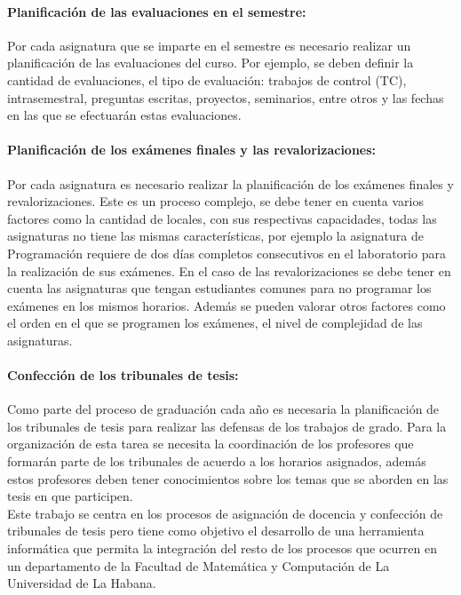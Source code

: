 \paragraph{Planificación de las evaluaciones en el semestre:}
Por cada asignatura que se imparte en el semestre es necesario realizar un planificación de 
las evaluaciones del curso. Por ejemplo, se deben definir la cantidad de evaluaciones, el tipo 
de evaluación: trabajos de control (TC), intrasemestral, preguntas escritas, proyectos, seminarios, entre 
otros y las fechas en las que se efectuarán estas evaluaciones.

\paragraph{Planificación de los exámenes finales y las revalorizaciones:}
Por cada asignatura es necesario realizar la planificación de los exámenes
finales y revalorizaciones. Este es un proceso complejo, se debe tener en cuenta 
varios factores como la cantidad de locales, con sus respectivas capacidades,
todas las asignaturas no tiene las mismas características, por ejemplo la asignatura de 
Programación requiere de dos días completos consecutivos en el laboratorio para 
la realización de sus exámenes. En el caso de las revalorizaciones
se debe tener en cuenta las asignaturas que tengan estudiantes comunes para no programar los 
exámenes en los mismos horarios. Además se pueden valorar otros factores como el orden en el que 
se programen los exámenes, el nivel de complejidad de las asignaturas.

\paragraph{Confección de los tribunales de tesis:}
Como parte del proceso de graduación cada año 
es necesaria la planificación de los tribunales de tesis para 
realizar las defensas de los trabajos de grado. Para la organización 
de esta tarea se necesita la coordinación de los profesores que formarán parte 
de los tribunales de acuerdo a los horarios asignados, además estos profesores 
deben tener conocimientos sobre los temas que se aborden en las tesis en que participen. \\


Este trabajo se centra en los procesos de asignación de docencia y confección de tribunales
de tesis pero tiene como objetivo el desarrollo de una herramienta informática que permita
la integración del resto de los procesos que ocurren en un departamento de la 
Facultad de Matemática y Computación de La Universidad de La Habana.



